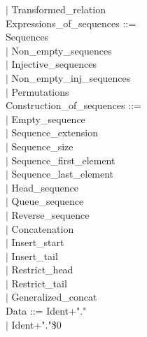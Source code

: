 \documentclass[12pt,a4paper,draft]{article}
\begin{document}
{\begin{sloppypar}
\hspace*{0.20in} $|$  Transformed\_relation\\
Expressions\_of\_sequences ::= \\
   Sequences\\
\hspace*{0.20in} $|$  Non\_empty\_sequences\\
\hspace*{0.20in} $|$  Injective\_sequences\\
\hspace*{0.20in} $|$  Non\_empty\_inj\_sequences\\
\hspace*{0.20in} $|$  Permutations\\
Construction\_of\_sequences ::= \\
\hspace*{0.20in} $|$  Empty\_sequence\\
\hspace*{0.20in} $|$  Sequence\_extension\\
\hspace*{0.20in} $|$  Sequence\_size\\
\hspace*{0.20in} $|$  Sequence\_first\_element\\
\hspace*{0.20in} $|$  Sequence\_last\_element\\
\hspace*{0.20in} $|$  Head\_sequence\\
\hspace*{0.20in} $|$  Queue\_sequence\\
\hspace*{0.20in} $|$  Reverse\_sequence\\
\hspace*{0.20in} $|$  Concatenation\\
\hspace*{0.20in} $|$  Insert\_start\\
\hspace*{0.20in} $|$  Insert\_tail\\
\hspace*{0.20in} $|$  Restrict\_head\\
\hspace*{0.20in} $|$  Restrict\_tail\\
\hspace*{0.20in} $|$  Generalized\_concat\\
Data    ::= Ident+"." \\
   \hspace*{0.20in} $|$ Ident+"."\$0 \\

\end{sloppypar}}
\end{document}
